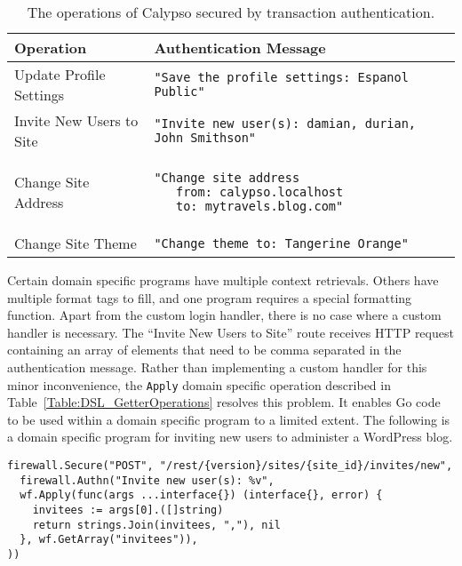 \begin{table}[h]
\centering

\begin{tabular}{ m{5cm} m{9cm}  } 
 \hline
 Operation & Authentication Message \\ 
 \hline \hline

 Update Profile Settings & \lstinline|"Save the profile settings: Espanol Public"| \\ \hline

 Invite New Users to Site & \lstinline|"Invite new user(s): damian, durian, John Smithson"| \\ \hline

 Change Site Address & 
 \begin{lstlisting} 
"Change site address
   from: calypso.localhost
   to: mytravels.blog.com"
\end{lstlisting} 
\\ \hline

 Change Site Theme & \lstinline|"Change theme to: Tangerine Orange"| \\ \hline

\end{tabular}
\caption{The operations of Calypso secured by transaction authentication.}
\label{Table:CalypsoSecuredRoutes}
\end{table}

Certain domain specific programs have multiple context retrievals. Others have multiple format tags to fill, and one program requires a special formatting function. Apart from the custom login handler, there is no case where a custom handler is necessary. 
The ``Invite New Users to Site'' route receives HTTP request containing an array of elements that need to be comma separated in the authentication message. Rather than implementing a custom handler for this minor inconvenience, the \lstinline{Apply} domain specific operation described in Table~\ref{Table:DSL_GetterOperations} resolves this problem. It enables Go code to be used within a domain specific program to a limited extent. The following is a domain specific program for inviting new users to administer a WordPress blog.

\iffalse
all of the routes in Calypso are protected using the DSL. 
\fi

\begin{lstlisting}[float=h]
firewall.Secure("POST", "/rest/{version}/sites/{site_id}/invites/new", 
  firewall.Authn("Invite new user(s): %v",
  wf.Apply(func(args ...interface{}) (interface{}, error) {
    invitees := args[0].([]string)
    return strings.Join(invitees, ","), nil
  }, wf.GetArray("invitees")),
))
\end{lstlisting}

